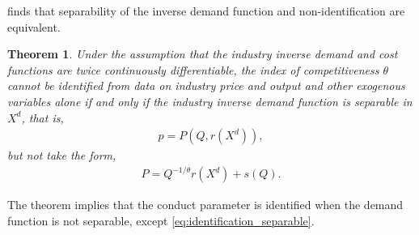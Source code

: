 \documentclass[11pt, a4paper]{article}
\newtheorem{theorem}{Theorem}
\theoremstyle{remark}
\begin{document}
\citet{lau1982identifying} finds that separability of the inverse demand function and non-identification are equivalent.
\begin{framed}
\begin{theorem}\label{theorem_lau}
    Under the assumption that the industry inverse demand and cost functions are twice continuously differentiable, the index of competitiveness $\theta$ cannot be identified from data on industry price and output and other exogenous variables alone if and only if the industry inverse demand function is separable in $X^{d}$, that is,
    \begin{align}
        p = P(Q, r(X^{d})), \label{eq:demand_separable}
    \end{align}
    but not take the form, 
    \begin{align}
        P = Q^{-1/\theta}r(X^{d}) + s(Q). \label{eq:identification_separable}
    \end{align}
\end{theorem}
\end{framed}
The theorem implies that the conduct parameter is identified when the demand function is not separable, except \eqref{eq:identification_separable}.

\begin{comment}
    \citet{bresnahan1982oligopoly} considers a model with linear demand and marginal cost.
    He considers a demand function such that $P = \alpha_0 + (\alpha_1 + \alpha_2 Z) Q + \alpha_3 Y + \alpha_4 Z  + \varepsilon$ where $Z$ is called a demand rotation instrument.
    It is easy to verify that this demand is not separable.
    Under the demand, the conduct parameter and the marginal cost parameter can be identified.
    \citet{matsumura2023resolving} provide more detailed conditions for the identification.
\end{comment}
\end{document}
